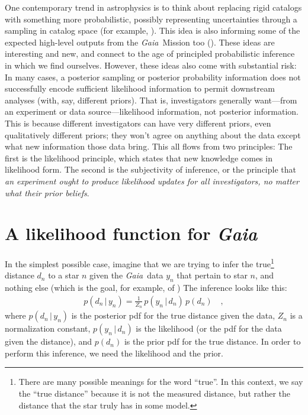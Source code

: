 \documentclass[12pt, modern]{aastex62}
\newcommand{\Gaia}{\textsl{Gaia}}
\newcommand{\given}{\,|\,}
\begin{document}
One contemporary trend in astrophysics is to think about replacing rigid
catalogs with something more probabilistic, possibly representing uncertainties
through a sampling in catalog space (for example, \citealt{brewer, portillo}).
This idea is also informing some of the expected high-level outputs from
the \Gaia\ Mission too (\citealt{apsis}).
These ideas are interesting and new, and connect to the age of principled
probabilistic inference in which we find ourselves.
However, these ideas also come with substantial risk:
In many cases, a posterior sampling or posterior probability information
does not successfully encode sufficient likelihood information to permit
downstream analyses (with, say, different priors).
That is, investigators generally want---from an experiment or data source---likelihood
information, not posterior information.
This is because different investigators can have very different priors,
even qualitatively different priors; they won't agree on anything about the
data except what new information those data bring.
This all flows from two principles: The first is the likelihood principle,
which states that new knowledge comes in likelihood form.
The second is the subjectivity of inference, or the principle that
\emph{an experiment ought to produce likelihood updates for all investigators,
no matter what their prior beliefs}.

\section{A likelihood function for \textsl{Gaia}}
In the simplest possible case, imagine that we are trying to infer
the true\footnote{There are many possible meanings for the word ``true''.
  In this context, we say the ``true distance'' because it is not the measured
  distance, but rather the distance that the star truly has in some model.}
distance $d_n$ to a star $n$ given the \Gaia\ data $y_n$ that
pertain to star $n$, and nothing else
(which is the goal, for example, of \citealt{tri2})
The inference looks like this:
\begin{eqnarray}
p(d_n\given y_n) = \frac{1}{Z_n}\,p(y_n\given d_n)\,p(d_n)
\label{eq:inference}
\quad ,
\end{eqnarray}
where
$p(d_n\given y_n)$ is the posterior pdf for the true distance given the data,
$Z_n$ is a normalization constant,
$p(y_n\given d_n)$ is the likelihood (or the pdf for the data given the distance),
and $p(d_n)$ is the prior pdf for the true distance.
In order to perform this inference, we need the likelihood and the prior.
\end{document}
